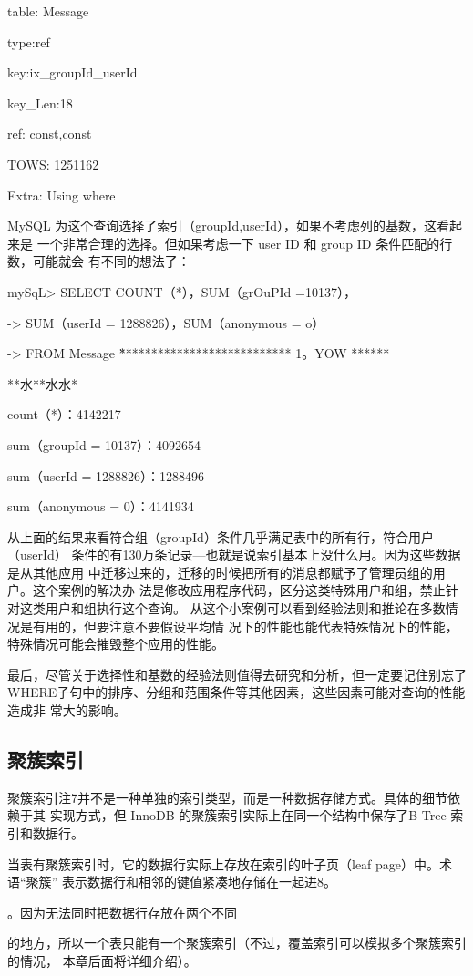 table: Message

type:ref

key:ix\_groupId\_userId

key\_Len:18

ref: const,const

TOWS: 1251162

Extra: Using where

MySQL 为这个查询选择了索引（groupId,userId），如果不考虑列的基数，这看起来是
一个非常合理的选择。但如果考虑一下 user ID 和 group ID 条件匹配的行数，可能就会
有不同的想法了：

mySqL> SELECT COUNT（*），SUM（grOuPId =10137），

-> SUM（userId = 1288826），SUM（anonymous = o）

-> FROM Message \G

*************************** 1。YOW ******

**水**水水*

count（*）：4142217

sum（groupId = 10137）：4092654

sum（userId = 1288826）：1288496

sum（anonymous = 0）：4141934

从上面的结果来看符合组（groupId）条件几乎满足表中的所有行，符合用户（userId）
条件的有130万条记录—也就是说索引基本上没什么用。因为这些数据是从其他应用
中迁移过来的，迁移的时候把所有的消息都赋予了管理员组的用户。这个案例的解决办
法是修改应用程序代码，区分这类特殊用户和组，禁止针对这类用户和组执行这个查询。
从这个小案例可以看到经验法则和推论在多数情况是有用的，但要注意不要假设平均情
况下的性能也能代表特殊情况下的性能，特殊情况可能会摧毁整个应用的性能。

最后，尽管关于选择性和基数的经验法则值得去研究和分析，但一定要记住别忘了
WHERE子句中的排序、分组和范围条件等其他因素，这些因素可能对查询的性能造成非
常大的影响。

\subsection{聚簇索引}
聚簇索引注7并不是一种单独的索引类型，而是一种数据存储方式。具体的细节依赖于其
实现方式，但 InnoDB 的聚簇索引实际上在同一个结构中保存了B-Tree 索引和数据行。

当表有聚簇索引时，它的数据行实际上存放在索引的叶子页（leaf page）中。术语“聚簇”
表示数据行和相邻的键值紧凑地存储在一起进8。

。因为无法同时把数据行存放在两个不同

的地方，所以一个表只能有一个聚簇索引（不过，覆盖索引可以模拟多个聚簇索引的情况，
本章后面将详细介绍）。

